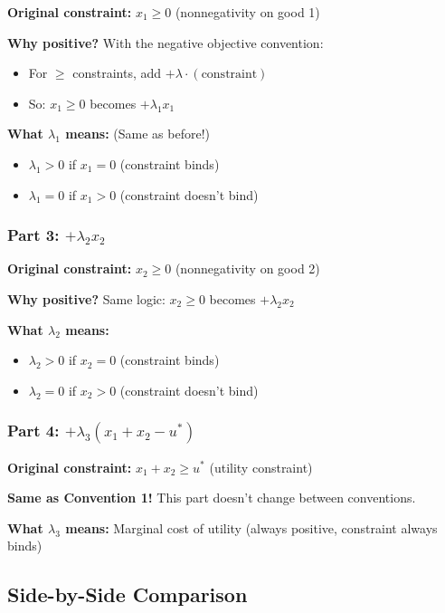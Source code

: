 \documentclass[11pt]{article}
\begin{document}
\textbf{Original constraint:} $x_1 \geq 0$ (nonnegativity on good 1)

\textbf{Why positive?} With the negative objective convention:
\begin{itemize}
\item For $\geq$ constraints, add $+\lambda \cdot (\text{constraint})$
\item So: $x_1 \geq 0$ becomes $+\lambda_1 x_1$
\end{itemize}

\textbf{What $\lambda_1$ means:} (Same as before!)
\begin{itemize}
\item $\lambda_1 > 0$ if $x_1 = 0$ (constraint binds)
\item $\lambda_1 = 0$ if $x_1 > 0$ (constraint doesn't bind)
\end{itemize}

\subsubsection{Part 3: $+\lambda_2 x_2$}

\textbf{Original constraint:} $x_2 \geq 0$ (nonnegativity on good 2)

\textbf{Why positive?} Same logic: $x_2 \geq 0$ becomes $+\lambda_2 x_2$

\textbf{What $\lambda_2$ means:}
\begin{itemize}
\item $\lambda_2 > 0$ if $x_2 = 0$ (constraint binds)
\item $\lambda_2 = 0$ if $x_2 > 0$ (constraint doesn't bind)
\end{itemize}

\subsubsection{Part 4: $+\lambda_3(x_1 + x_2 - u^*)$}

\textbf{Original constraint:} $x_1 + x_2 \geq u^*$ (utility constraint)

\textbf{Same as Convention 1!} This part doesn't change between conventions.

\textbf{What $\lambda_3$ means:} Marginal cost of utility (always positive, constraint always binds)

\subsection{Side-by-Side Comparison}
\end{document}
